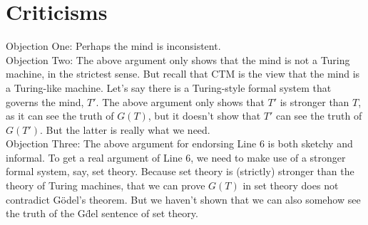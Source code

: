 \documentclass[11pt]{article}
\theoremstyle{definition}
\begin{document}
\section{Criticisms}

Objection One: Perhaps the mind is inconsistent. \\

\noindent
Objection Two: The above argument only shows that the mind is not a Turing machine, in the strictest sense. But recall that CTM is the view that the mind is a Turing-like machine. Let's say there is a Turing-style formal system that governs the mind, $T'$. The above argument only shows that $T'$ is stronger than $T$, as it can see the truth of $G(T)$, but it doesn't show that $T'$ can see the truth of $G(T')$. But the latter is really what we need.\\

\noindent
Objection Three: The above argument for endorsing Line 6 is both sketchy and informal. To get a real argument of Line 6, we need to make use of a stronger formal system, say, set theory. Because set theory is (strictly) stronger than the theory of Turing machines, that we can prove $G(T)$ in set theory does not contradict G\"odel's theorem. But we haven't shown that we can also somehow see the truth of the G\"del sentence of set theory.
\end{document}
